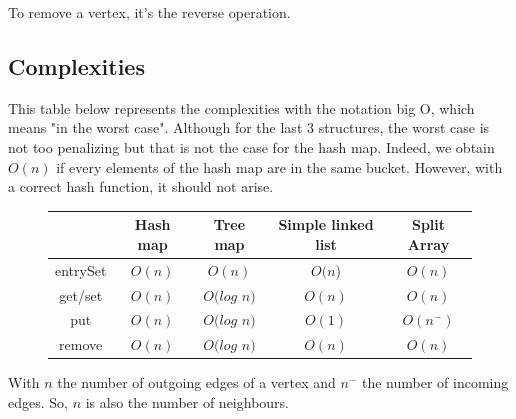 To remove a vertex, it's the reverse operation.


\subsection{Complexities}

This table below represents the complexities with the notation big O, which means "in the worst case". Although for the last 3 structures, the worst case is not too penalizing but that is not the case for the hash map. Indeed, we obtain $O(n)$ if every elements of the hash map are in the same bucket. However, with a correct hash function, it should not arise. \newline
\begin{figure}[H]
\centering
\begin{tabular}{|c|c|c|c|c|}
	\hline
     & \textbf{Hash map} & \textbf{Tree map} & \textbf{Simple linked list} & \textbf{Split Array} \\
     \hline	
   entrySet & $O(n)$ & $O(n)$ & $O(n$) & $O(n)$\\
   get/set & $O(n)$ & $O(log$ $n)$ & $O(n)$ & $O(n)$\\
   put & $O(n)$ & $O(log$ $n)$ & $O(1)$ & $O(n^-)$\\
   remove & $O(n)$ & $O(log$ $n)$ & $O(n)$ & $O(n)$\\
   \hline
\end{tabular} 
\end{figure}

With $n$ the number of outgoing edges of a vertex and $n^-$ the number of incoming edges. So, $n$ is also the number of neighbours.